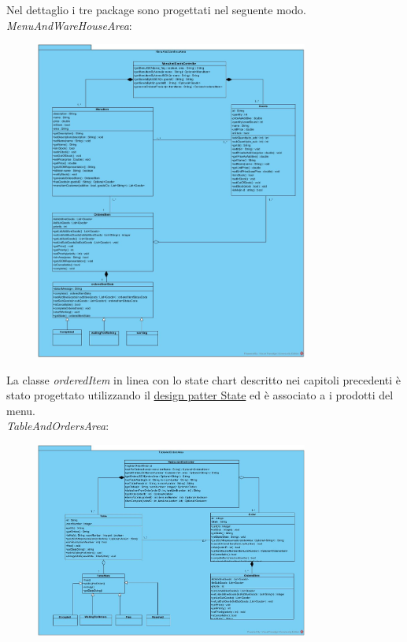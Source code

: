 Nel dettaglio i tre package sono progettati nel seguente modo.
\vspace{0.5cm}
\\\textit{MenuAndWareHouseArea}:
\begin{figure}[H]
	\centering
	\includegraphics[width=0.8\textwidth]{Immagini/MenuAndWareHouseArea.jpg}
\end{figure}
La classe \textit{orderedItem} in linea con lo state chart descritto nei capitoli precedenti è stato progettato utilizzando il \underline{design patter State} ed è associato a i prodotti del menu.
\vspace{0.5cm}
\\\textit{TableAndOrdersArea}:
\begin{figure}[H]
	\centering
	\includegraphics[width=0.8\textwidth]{Immagini/TableAndOrdersArea.jpg}
\end{figure}
